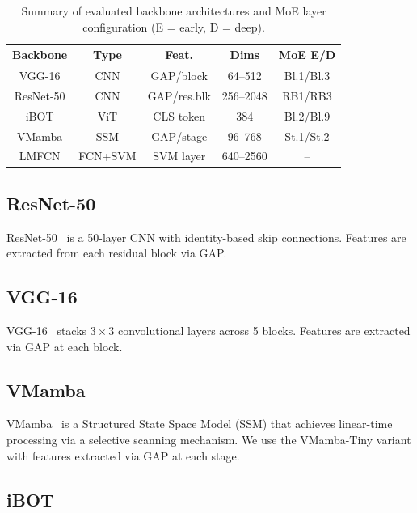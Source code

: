 \documentclass[conference]{IEEEtran}
\begin{document}
\begin{table}[htbp]
\caption{Summary of evaluated backbone architectures and MoE layer
         configuration (E = early, D = deep).}
\begin{center}
\begin{tabular}{c|c|c|c|c}
\hline
\textbf{Backbone} & \textbf{Type} & \textbf{Feat.} & \textbf{Dims} & \textbf{MoE E/D} \\
\hline
VGG-16    & CNN   & GAP/block  & 64--512   & Bl.1/Bl.3  \\
ResNet-50 & CNN   & GAP/res.blk& 256--2048 & RB1/RB3    \\
iBOT      & ViT   & CLS token  & 384       & Bl.2/Bl.9  \\
VMamba    & SSM   & GAP/stage  & 96--768   & St.1/St.2  \\
LMFCN     & FCN+SVM & SVM layer& 640--2560 & --         \\
\hline
\end{tabular}
\label{tab_backbones}
\end{center}
\end{table}

\subsection{ResNet-50}

ResNet-50~\cite{b4} is a 50-layer CNN with identity-based skip connections.
Features are extracted from each residual block via GAP.

\subsection{VGG-16}

VGG-16~\cite{b7} stacks $3{\times}3$ convolutional layers across 5 blocks.
Features are extracted via GAP at each block.

\subsection{VMamba}

VMamba~\cite{b16} is a Structured State Space Model (SSM) that achieves
linear-time processing via a selective scanning mechanism.
We use the VMamba-Tiny variant with features extracted via GAP at each stage.

\subsection{iBOT}
\end{document}
